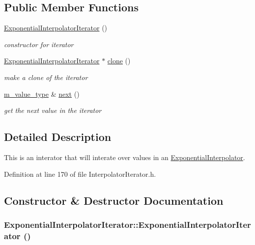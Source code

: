 \subsection*{Public Member Functions}
\begin{CompactItemize}
\item 
\hyperlink{classExponentialInterpolatorIterator_a0}{Exponential\-Interpolator\-Iterator} ()
\begin{CompactList}\small\item\em constructor for iterator \item\end{CompactList}\item 
\hyperlink{classExponentialInterpolatorIterator}{Exponential\-Interpolator\-Iterator} $\ast$ \hyperlink{classExponentialInterpolatorIterator_a1}{clone} ()
\begin{CompactList}\small\item\em make a clone of the iterator \item\end{CompactList}\item 
\hyperlink{Types_8h_a3}{m\_\-value\_\-type} \& \hyperlink{classExponentialInterpolatorIterator_a2}{next} ()
\begin{CompactList}\small\item\em get the next value in the iterator \item\end{CompactList}\end{CompactItemize}


\subsection{Detailed Description}
This is an interator that will interate over values in an \hyperlink{classExponentialInterpolator}{Exponential\-Interpolator}. 



Definition at line 170 of file Interpolator\-Iterator.h.

\subsection{Constructor \& Destructor Documentation}
\hypertarget{classExponentialInterpolatorIterator_a0}{
\subsubsection[ExponentialInterpolatorIterator]{\setlength{\rightskip}{0pt plus 5cm}Exponential\-Interpolator\-Iterator::Exponential\-Interpolator\-Iterator ()}}
\label{classExponentialInterpolatorIterator_a0}


